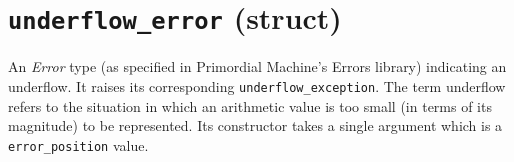 \documentclass[oneside]{book}
\begin{document}
\section{\texttt{underflow\_error} (struct)}
An \textit{Error} type (as specified in Primordial Machine's Errors library) indicating an underflow.
It raises its corresponding \texttt{underflow\_exception}.
The term underflow refers to the situation in which an arithmetic value is too small (in terms of
its magnitude) to be represented. Its constructor takes a single argument which
is a \texttt{error\_position} value.
\end{document}
